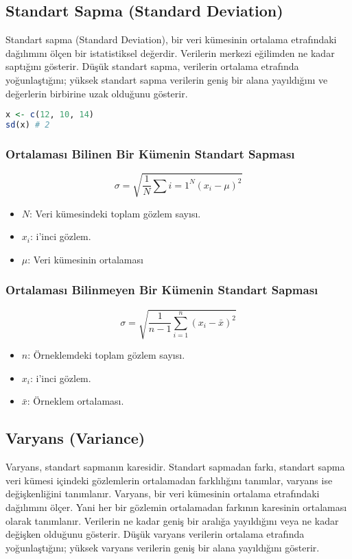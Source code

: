 \subsection{Standart Sapma (Standard Deviation)}
Standart sapma (Standard Deviation), bir veri kümesinin ortalama etrafındaki dağılımını ölçen bir istatistiksel değerdir. Verilerin merkezi eğilimden ne kadar saptığını gösterir. Düşük standart sapma, verilerin ortalama etrafında yoğunlaştığını; yüksek standart sapma verilerin geniş bir alana yayıldığını ve değerlerin birbirine uzak olduğunu gösterir.

\begin{lstlisting}[language=R]
x <- c(12, 10, 14)
sd(x) # 2
\end{lstlisting}

\subsubsection{Ortalaması Bilinen Bir Kümenin Standart Sapması}

\[
\sigma = \sqrt{\frac{1}{N} \sum{i=1}^{N} (x_i - \mu)^2}
\]

\begin{itemize}
    \item $N$: Veri kümesindeki toplam gözlem sayısı.
    \item $x_i$: i'inci gözlem.
    \item $\mu$: Veri kümesinin ortalaması
\end{itemize}

\subsubsection{Ortalaması Bilinmeyen Bir Kümenin Standart Sapması}

\[
\sigma = \sqrt{\frac{1}{n-1} \sum_{i=1}^{n} (x_i - \bar{x})^2}
\]

\begin{itemize}
    \item $n$: Örneklemdeki toplam gözlem sayısı.
    \item $x_i$: i'inci gözlem.
    \item $\bar{x}$: Örneklem ortalaması. 
\end{itemize}

\subsection{Varyans (Variance)}
Varyans, standart sapmanın karesidir. Standart sapmadan farkı, standart sapma veri kümesi içindeki gözlemlerin ortalamadan farklılığını tanımlar, varyans ise değişkenliğini tanımlanır. Varyans, bir veri kümesinin ortalama etrafındaki dağılımını ölçer. Yani her bir gözlemin ortalamadan farkının karesinin ortalaması olarak tanımlanır. Verilerin ne kadar geniş bir aralığa yayıldığını veya ne kadar değişken olduğunu gösterir. Düşük varyans verilerin ortalama etrafında yoğunlaştığını; yüksek varyans verilerin geniş bir alana yayıldığını gösterir. 

